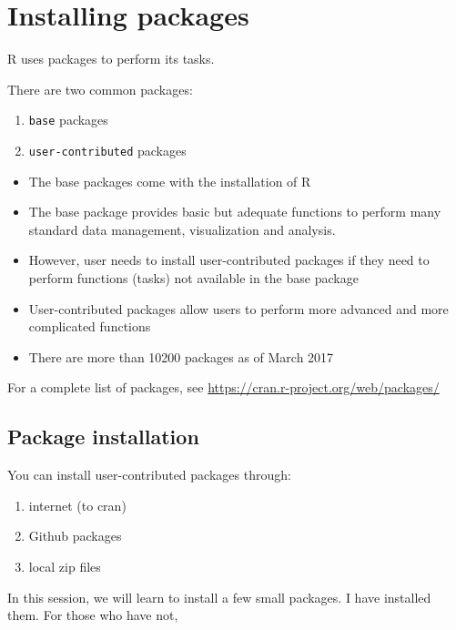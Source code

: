\documentclass[]{book}
\providecommand{\tightlist}{%
  \setlength{\itemsep}{0pt}\setlength{\parskip}{0pt}}
\theoremstyle{definition}
\theoremstyle{definition}
\theoremstyle{remark}
\begin{document}
\section{Installing packages}\label{installing-packages}

R uses packages to perform its tasks.

There are two common packages:

\begin{enumerate}
\def\labelenumi{\arabic{enumi}.}
\tightlist
\item
  \texttt{base} packages
\item
  \texttt{user-contributed} packages
\end{enumerate}

\begin{itemize}
\tightlist
\item
  The base packages come with the installation of R
\item
  The base package provides basic but adequate functions to perform many
  standard data management, visualization and analysis.
\item
  However, user needs to install user-contributed packages if they need
  to perform functions (tasks) not available in the base package
\item
  User-contributed packages allow users to perform more advanced and
  more complicated functions
\item
  There are more than 10200 packages as of March 2017
\end{itemize}

For a complete list of packages, see
\url{https://cran.r-project.org/web/packages/}

\subsection{Package installation}\label{package-installation}

You can install user-contributed packages through:

\begin{enumerate}
\def\labelenumi{\arabic{enumi}.}
\tightlist
\item
  internet (to cran)
\item
  Github packages
\item
  local zip files
\end{enumerate}

In this session, we will learn to install a few small packages. I have
installed them. For those who have not,
\end{document}
